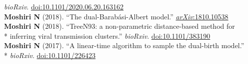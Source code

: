 \documentclass[margin,line]{res}
\begin{document}
\begin{resume}
\hspace*{8mm} \textit{bioRxiv}. \href{https://doi.org/10.1101/2020.06.20.163162}{doi:10.1101/2020.06.20.163162}\\
\hspace*{4mm} \vspace{2mm}\textbf{Moshiri N} (2018). ``The dual-Barab\'asi-Albert model.'' \href{https://arxiv.org/abs/1810.10538}{\textit{arXiv}:1810.10538}\\
\hspace*{4mm} \textbf{Moshiri N} (2018). ``TreeN93: a non-parametric distance-based method for\\*\vspace{2mm}
\hspace*{8mm} inferring viral transmission clusters.'' \textit{bioRxiv}. \href{https://doi.org/10.1101/383190}{doi:10.1101/383190}\\
\hspace*{4mm} \textbf{Moshiri N} (2017). ``A linear-time algorithm to sample the dual-birth model.''\\*\vspace{2mm}
\hspace*{8mm} \textit{bioRxiv}. \href{https://doi.org/10.1101/226423}{doi:10.1101/226423}\\


\end{resume}
\end{document}
